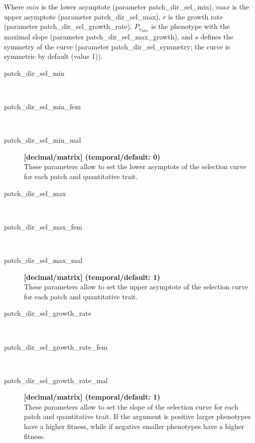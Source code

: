 \documentclass[letterpaper,12pt,oneside]{book}
\begin{document}
Where $min$ is the lower asymptote (parameter \textsf{patch\_dir\_sel\_min}), $max$ is the upper asymptote (parameter \textsf{patch\_dir\_sel\_max}), $r$ is the growth rate (parameter \textsf{patch\_dir\_sel\_growth\_rate}), $P_{r_{Max}}$ is the phenotype with the maximal slope (parameter \textsf{patch\_dir\_sel\_max\_growth}), and $s$ defines the symmetry of the curve (parameter \textsf{patch\_dir\_sel\_symmetry}; the curve is symmetric by default (value 1)).


\begin{description}

\item[patch\_dir\_sel\_min]\hspace*{\fill}\\
\vspace{-9mm}
\item[patch\_dir\_sel\_min\_fem]\hspace*{\fill}\\
\vspace{-9mm}
\item[patch\_dir\_sel\_min\_mal]\textbf{[decimal/matrix] (temporal/default: 0)}\\
These parameters allow to set the lower asymptote of the selection curve for each patch and quantitative trait.

\item[patch\_dir\_sel\_max]\hspace*{\fill}\\
\vspace{-9mm}
\item[patch\_dir\_sel\_max\_fem]\hspace*{\fill}\\
\vspace{-9mm}
\item[patch\_dir\_sel\_max\_mal]\textbf{[decimal/matrix] (temporal/default: 1)}\\
These parameters allow to set the upper asymptote of the selection curve for each patch and quantitative trait.

\item[patch\_dir\_sel\_growth\_rate]\hspace*{\fill}\\
\vspace{-9mm}
\item[patch\_dir\_sel\_growth\_rate\_fem]\hspace*{\fill}\\
\vspace{-9mm}
\item[patch\_dir\_sel\_growth\_rate\_mal]\textbf{[decimal/matrix] (temporal/default: 1)}\\
These parameters allow to set the slope of the selection curve for each patch and quantitative trait. If the argument is positive larger phenotypes have a higher fitness, while if negative smaller phenotypes have a higher fitness. 


\end{description}
\end{document}
